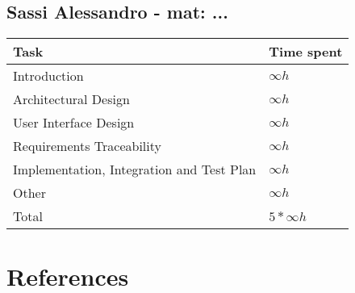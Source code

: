 \documentclass[11pt]{article}
\begin{document}
\subsection{Sassi Alessandro - mat: ...}

\begin{tabular}{|l|l|}
    \hline
    \textbf{Task} & \textbf{Time spent} \\
    \hline
    Introduction & $\infty h$ \\
    \hline
    Architectural Design & $\infty h$ \\
    \hline
    User Interface Design & $\infty h$ \\
    \hline
    Requirements Traceability & $\infty h$ \\
    \hline
    Implementation, Integration and Test Plan & $\infty h$ \\
    \hline
    Other & $\infty h$ \\
    \hline
    \hline
    Total & $5*\infty h$ \\
    \hline
\end{tabular}

\newpage

\section{References}
\end{document}
